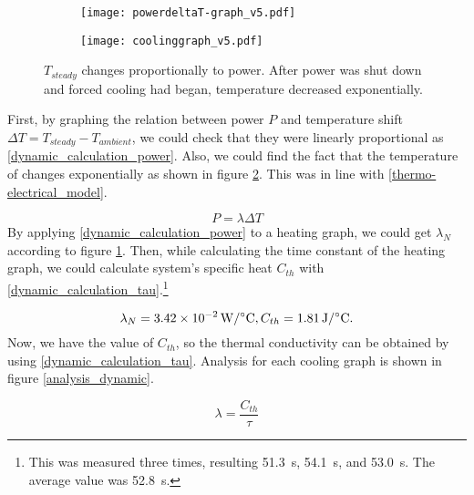 \begin{figure}[t]
	\centering
	\begin{subfigure}[t]{0.45\linewidth}
		\centering\texttt{[image: powerdeltaT-graph\_v5.pdf]}
		\caption{\label{powerdeltaT}}
	\end{subfigure}%
	\begin{subfigure}[t]{0.45\linewidth}
		\centering\texttt{[image: coolinggraph\_v5.pdf]}
		\caption{\label{coolinggraph}}
	\end{subfigure}
	\caption[Results of the dynamic experiment]{ $ T_{steady} $ changes proportionally to power.  After power was shut down and forced cooling had began, temperature decreased exponentially.}
	\label{result_dynamic}
\end{figure}

First, by graphing the relation between power $P$ and temperature shift $\Delta{T}=T_{steady}-T_{ambient}$, we could check that they were linearly proportional as \eqref{dynamic_calculation_power}.
Also, we could find the fact that the temperature of \scp changes exponentially as shown in figure \ref{coolinggraph}. This was in line with  \eqref{thermo-electrical_model}.

\begin{equation} \label{dynamic_calculation_power}
P = \lambda\Delta{T}
\end{equation}
By applying \eqref{dynamic_calculation_power} to a heating graph, we could get $\lambda_{N}$ according to figure \ref{powerdeltaT}. Then, while calculating the time constant of the heating graph, we could calculate \scp system's specific heat $C_{th}$ with \eqref{dynamic_calculation_tau}.\footnote{This was measured three times, resulting \SI{51.3}{\second}, \SI{54.1}{\second}, and \SI{53.0}{\second}. The average value was \SI{52.8}{\second}.} 

\begin{equation}
\lambda_{N}=\SI{3.42e-2}{\watt\per\degreeCelsius}, C_{th}=\SI{1.81}{\joule\per\degreeCelsius}. \notag
\end{equation}
Now, we have the value of $C_{th}$, so the thermal conductivity can be obtained by using \eqref{dynamic_calculation_tau}. Analysis for each cooling graph is shown in figure \ref{analysis_dynamic}.

\begin{equation} \label{dynamic_calculation_tau}
\lambda = \frac{C_{th}}{\tau}
\end{equation}

